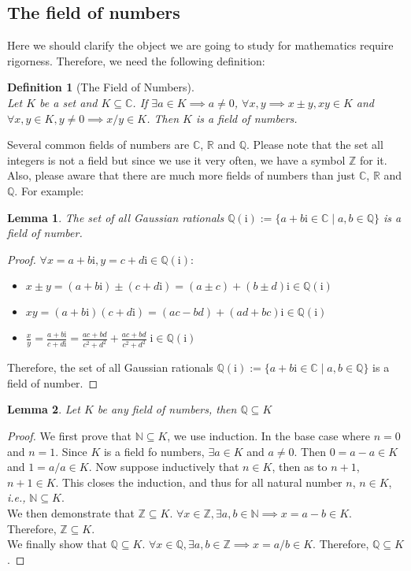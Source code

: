 \documentclass[a4paper,oneside]{book}
\newtheorem*{proof}{\textit{Proof.}}
\newcommand\im{\mathrm{i}}
\newtheorem{definition}{Definition}[section]
\newtheorem{lemma}{Lemma}[section]
\begin{document}
				\subsection{The field of numbers}
					Here we should clarify the object we are going to study for mathematics require rigorness. Therefore, we need the following definition:
					\begin{definition}[The Field of Numbers]
						~\\Let $K$ be a set and $K\subseteq\mathbb{C}$. If $\exists a\in K\implies a\neq0$, $\forall x,y\implies x\pm y,xy\in K$ and $\forall x,y\in K, y\neq 0\implies x/y\in K$. Then $K$ is a field of numbers.
					\end{definition}
					Several common fields of numbers are $\mathbb{C}$, $\mathbb{R}$ and $\mathbb{Q}$. Please note that the set all integers is not a field but since we use it very often, we have a symbol $\mathbb{Z}$ for it.\\
					Also, please aware that there are much more fields of numbers than just $\mathbb{C}$, $\mathbb{R}$ and $\mathbb{Q}$. For example:
					\begin{lemma}
						The set of all Gaussian rationals $\mathbb{Q}(\im):=\{a+b\im\in\mathbb{C}\mid a,b\in \mathbb{Q}\}$ is a field of number.
					\end{lemma}
					\begin{proof}
						$\forall x=a+b\im,y=c+d\im\in\mathbb{Q}(\im):$
						\begin{itemize}
							\item $x\pm y=(a+b\im)\pm(c+d\im)=(a\pm c)+(b\pm d)\im\in \mathbb{Q}(\im)$
							\item $xy=(a+b\im)(c+d\im)=(ac-bd)+(ad+bc)\im\in \mathbb{Q}(\im)$
							\item $\displaystyle\frac{x}{y}=\frac{a+b\im}{c+d\im}=\frac{ac+bd}{c^2+d^2}+\frac{ac+bd}{c^2+d^2}\;\im\in \mathbb{Q}(\im)$
						\end{itemize}
						Therefore, the set of all Gaussian rationals $\mathbb{Q}(\im):=\{a+b\im\in\mathbb{C}\mid a,b\in \mathbb{Q}\}$ is a field of number.
					\end{proof}
					\begin{lemma}
						Let $K$ be any field of numbers, then $\mathbb{Q}\subseteq K$
					\end{lemma}
					\begin{proof}
						We first prove that $\mathbb{N}\subseteq K$, we use induction. In the base case where $n=0$ and $n=1$. Since $K$ is a field fo numbers, $\exists a\in K$ and $a\neq0$. Then $0=a-a\in K$ and $1=a/a\in K$. Now suppose inductively that $n\in K$, then as to $n+1$, $n+1\in K$. This closes the induction, and thus for all natural number $n$, $n\in K$, \textit{i.e.,} $\mathbb{N}\subseteq K$.\\
						We then demonstrate that $\mathbb{Z}\subseteq K$. $\forall x\in\mathbb{Z}, \exists a,b\in\mathbb{N}\implies x=a-b\in K$. Therefore, $\mathbb{Z}\subseteq K$.\\
						We finally show that $\mathbb{Q}\subseteq K$. $\forall x\in\mathbb{Q}, \exists a,b\in\mathbb{Z}\implies x=a/b\in K$. Therefore, $\mathbb{Q}\subseteq K$.
					\end{proof}
\end{document}
